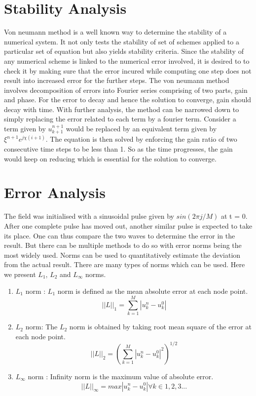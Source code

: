 \documentclass[a4paper,12pt]{report}
\begin{document}
\section{Stability Analysis}
Von neumann method is a well known way to determine the stability of a numerical system. It not only tests the stability of set of schemes applied to a particular set of equation but also yields stability criteria. Since the stability of any numerical scheme is linked to the numerical error involved, it is desired to to check it by making sure that the error incured while computing one step does not result into increased error for the further steps. The von neumann method involves decomposition of errors into Fourier series comprising of two parts, gain and phase. For the error to decay and hence the solution to converge, gain should decay with time. With further analysis, the method can be narrowed down to simply replacing the error related to each term by  a fourier term. Consider a term given by $u_{k+1}^{n+1}$ would be replaced by an equivalent term given by $\xi^{n+1}e^{j\chi (i+1)}$. The equation is then solved by enforcing the gain ratio of two consecutive time steps to be less than 1. So as the time progresses, the gain would keep on reducing which is essential for the solution to converge. 
\section{Error Analysis}
The field was initialised with a sinusoidal pulse given by $sin(2\pi j/M)$ at t = 0. After one complete pulse has moved out, another similar pulse is expected to take its place. One can thus compare the two waves to determine the error in the result. But there can be multiple methods to do so with error norms being the most widely used. Norms can be used to quantitatively estimate the deviation from the actual result. There are many types of norms which can be used. Here we present $L_1$, $L_2$ and $L_{\infty}$ norms.
\begin{enumerate}
\item $L_1$ norm : $L_1$ norm is defined as the mean absolute error at each node point. 
\[ ||L||_1 =  \sum_{k=1}^M|u^{n}_{k}-u^{0}_{k}| \]
\item $L_2$ norm: The $L_2$ norm is obtained by taking root mean square of the error at each node point.
\[ ||L||_2 = (\sum_{k=1}^M|u^{n}_{k}-u^{0}_{k}|^2)^{1/2}\]
\item $L_{\infty}$ norm : Infinity norm is the maximum value of absolute error. 
\[ ||L||_{\infty} = max {|u^{n}_{k}-u^{0}_{k}|} \forall k\in{1,2,3...} \]
\end{enumerate}
\end{document}
